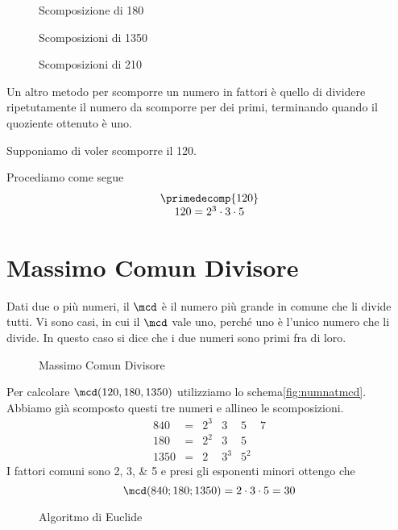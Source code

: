\begin{figure} 
	\centering

	\caption[]{Scomposizione di \num{180}}
	\label{fig:AlberoBinario2}
\end{figure}
\begin{figure} 
\centering

	\caption[]{Scomposizioni di \num{1350}}
	\label{fig:AlberoBinario3}
\end{figure}%
\begin{figure} 
\centering

	\caption[]{Scomposizioni di \num{210}}
	\label{fig:AlberoBinario6}
\end{figure}%
Un altro metodo per scomporre un numero in fattori  è quello di dividere ripetutamente  il numero da scomporre per dei primi, terminando quando il quoziente ottenuto è uno.
\begin{esempiot}{}{}
Supponiamo di voler scomporre il \num{120}. 
\end{esempiot}
Procediamo come segue
	\[
	\begin{array}{c}
	\primedecomp{120}\\
	120 =2^3\cdot 3\cdot 5
	\end{array}
	\]

\section{Massimo Comun Divisore}
\label{sec:macdNaturali}
Dati due o più numeri, il $\mcd$ è il numero più grande in comune che li divide tutti. Vi sono casi, in cui il $\mcd$ vale uno, perché uno è l'unico numero che li divide. In questo caso si dice che i due numeri sono primi fra di loro.
 	\begin{figure}
	\centering

	\caption{Massimo Comun Divisore}
	\label{fig:numnatmcd}
\end{figure}
 Per calcolare $\mcd(120,180,1350)$ utilizziamo lo schema\nobs\vref{fig:numnatmcd}. Abbiamo già scomposto questi tre numeri e  	
 allineo le scomposizioni.
   \[
   \begin{array}{rcllll}
   840&= & 2^3 & 3& 5 & 7\\
   180&= & 2^2 & 3& 5 \\
   1350&= & 2 & 3^3& 5^2
   \end{array}
   \]
   I fattori comuni sono \numlist{2;3;5} e presi gli esponenti minori ottengo che
     \[\mcd(840;180;1350)=2\cdot 3\cdot 5=30 \]
    \begin{figure}
    	\centering
    
    	\caption{Algoritmo di Euclide}
    	\label{fig:algoritmoEuclide}
    \end{figure}
   
